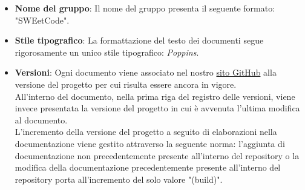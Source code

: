 \documentclass[10pt, a4paper]{article}
\begin{document}
\begin{itemize}
        \item{\textbf{Nome del gruppo}}: Il nome del gruppo presenta il seguente formato: "SWEetCode".

        \item{\textbf{Stile tipografico}}: La formattazione del testo dei documenti segue rigorosamente un unico stile tipografico: 
        \textit{Poppins}.
        
        \item {\textbf{Versioni}}: Ogni documento viene associato nel nostro \href{https://sweetcode-team.github.io/}{sito GitHub} alla 
        versione del progetto per cui risulta essere ancora in vigore.\\
        All'interno del documento, nella prima riga del registro delle versioni, viene invece presentata la versione del progetto in cui è 
        avvenuta l'ultima modifica al documento.\\
        L'incremento della versione del progetto a seguito di elaborazioni nella documentazione viene gestito attraverso la seguente norma: 
        l'aggiunta di documentazione non precedentemente presente all'interno del repository o la modifica della documentazione 
        precedentemente presente all'interno del repository porta all'incremento del solo valore "(build)".
        \end{itemize}
\end{document}

